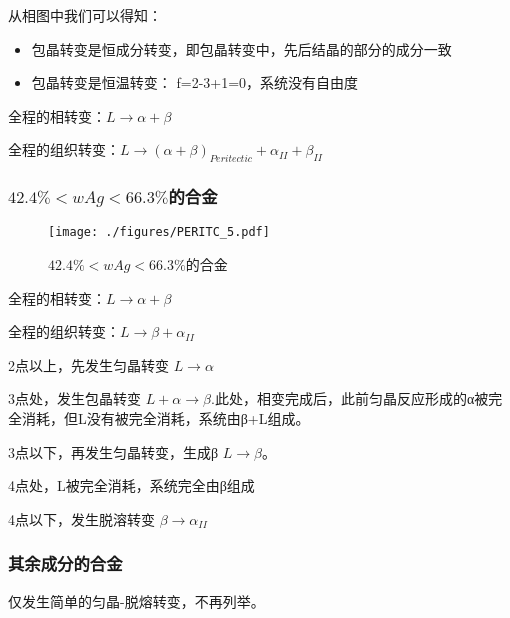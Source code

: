 从相图中我们可以得知：
\begin{itemize}
\item 包晶转变是恒成分转变，即包晶转变中，先后结晶的部分的成分一致
\item 包晶转变是恒温转变： f=2-3+1=0，系统没有自由度
\end{itemize}

全程的相转变：$L \rightarrow \alpha+\beta$

全程的组织转变：$L \rightarrow (\alpha+\beta)_{Peritectic} + \alpha_{II} + \beta_{II}$








\subsubsection{$42.4\%<wAg<66.3\%$的合金}
\begin{figure}[ht]
\centering
\texttt{[image: ./figures/PERITC\_5.pdf]}
\caption{$42.4\%<wAg<66.3\%$的合金} \label{PERITC_fig5}
\end{figure}
全程的相转变：$L \rightarrow \alpha+\beta$

全程的组织转变：$L \rightarrow \beta + \alpha_{II}$

2点以上，先发生匀晶转变 $L \rightarrow \alpha$

3点处，发生包晶转变 $L + \alpha \rightarrow \beta$.此处，相变完成后，此前匀晶反应形成的α被完全消耗，但L没有被完全消耗，系统由β+L组成。

3点以下，再发生匀晶转变，生成β $L \rightarrow \beta$。

4点处，L被完全消耗，系统完全由β组成

4点以下，发生脱溶转变 $\beta \rightarrow \alpha_{II}$

\subsubsection{其余成分的合金}
仅发生简单的匀晶-脱熔转变，不再列举。

